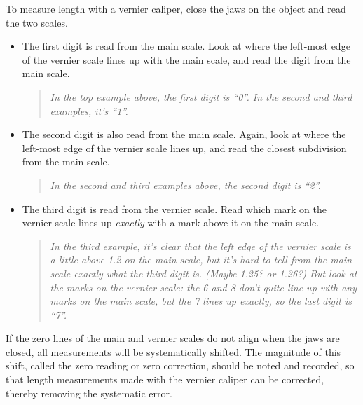 To measure length with a vernier caliper, close the jaws on the object and read the two scales.
\begin{itemize}
\item The first digit is read from the main scale.  Look at where the left-most edge of the vernier scale lines up with the main scale, and read the digit from the main scale.  

\begin{quote}
\textit{In the top example above, the first digit is ``0''.  
In the second and third examples, it's ``1''.}
\end{quote}
\item The second digit is also read from the main scale.  Again, look at where the left-most edge of the vernier scale lines up, and read the closest subdivision from the main scale.  

\begin{quote}
\textit{In the second and third examples above, the second digit is ``2''.}
\end{quote}

\item The third digit is read from the vernier scale.  Read which mark on the vernier scale lines up \textit{exactly} with a mark above it on the main scale. 

\begin{quote}
\textit{In the third example, it's clear that the left edge of the vernier scale is a little above 1.2 on the main scale, but it's hard to tell from the main scale exactly what the third digit is.  (Maybe 1.25? or 1.26?)  But look at the marks on the vernier scale: the 6 and 8 don't quite line up with any marks on the main scale, but the 7 lines up exactly, so the last digit is ``7''.}
\end{quote}
\end{itemize}

If the zero lines of the main and vernier scales do not align when the jaws are closed, all measurements will be systematically shifted. The magnitude of this shift, called the zero reading or zero correction, should be noted and recorded, so that length measurements made with the vernier caliper can be corrected, thereby removing the systematic error.

